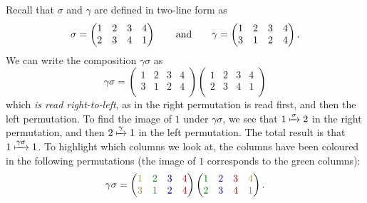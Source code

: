 \begin{example}
     Recall that $\sigma$ and $\gamma$ are defined in two-line form as
    \[
    \sigma = \begin{pmatrix}
        1 & 2 & 3 & 4 \\
        2 & 3 & 4 & 1 \\
    \end{pmatrix} \hspace{20pt}\text{and}\hspace{20pt} \gamma = \begin{pmatrix}
        1 & 2 & 3 & 4 \\
        3 & 1 & 2 & 4 \\
    \end{pmatrix}.
    \]
    We can write the composition $\gamma\sigma$ as
    \[
    \gamma\sigma = \begin{pmatrix}
        1 & 2 & 3 & 4 \\
        3 & 1 & 2 & 4 \\
    \end{pmatrix}\begin{pmatrix}
        1 & 2 & 3 & 4 \\
        2 & 3 & 4 & 1 \\
    \end{pmatrix}
    \]
    which \textit{is read right-to-left}, as in the right permutation is read first, and then the left permutation. To find the image of $1$ under $\gamma\sigma$, we see that $1 \xmapsto{\sigma} 2$ in the right permutation, and then $2 \xmapsto{\gamma} 1$ in the left permutation. The total result is that $1 \xmapsto{\gamma\sigma} 1$. To highlight which columns we look at, the columns have been coloured in the following permutations (the image of $1$ corresponds to the green columns):
    \[
    \gamma\sigma = \begin{pmatrix}
        \textcolor{yellow!50!black}{1} & \textcolor{green!50!black}{2} & \textcolor{blue!50!black}{3} & \textcolor{red!50!black}{4} \\
        \textcolor{yellow!50!black}{3} & \textcolor{green!50!black}{1} & \textcolor{blue!50!black}{2} & \textcolor{red!50!black}{4} \\
    \end{pmatrix}\begin{pmatrix}
        \textcolor{green!50!black}{1} & \textcolor{blue!50!black}{2} & \textcolor{red!50!black}{3} & \textcolor{yellow!50!black}{4} \\
        \textcolor{green!50!black}{2} & \textcolor{blue!50!black}{3} & \textcolor{red!50!black}{4} & \textcolor{yellow!50!black}{1} \\
    \end{pmatrix}.
\]
\end{example}
